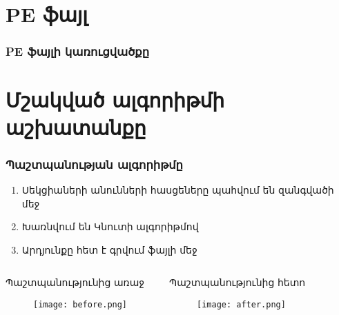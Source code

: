 \documentclass[11pt]{beamer}
\begin{document}
\section{PE ֆայլ}

\begin{frame}\frametitle{PE ֆայլի կառուցվածքը}
\end{frame}

\section{Մշակված ալգորիթմի աշխատանքը}

\begin{frame}\frametitle{Պաշտպանության ալգորիթմը}
\begin{enumerate}
\item Սեկցիաների անունների հասցեները պահվում են զանգվածի մեջ
\item Խառնվում են Կնուտի ալգորիթմով
\item Արդյունքը հետ է գրվում ֆայլի մեջ
\end{enumerate}
\begin{columns}[t]
\begin{block}{\small{Պաշտպանությունից առաջ}}
\begin{figure}[p]
\centering
\texttt{[image: before.png]}
\end{figure}
\end{block}
\begin{block}{\small{Պաշտպանությունից հետո}}
\begin{figure}[p]
\centering
\texttt{[image: after.png]}
\end{figure}
\end{block}
\end{columns}
\end{frame}
\end{document}
